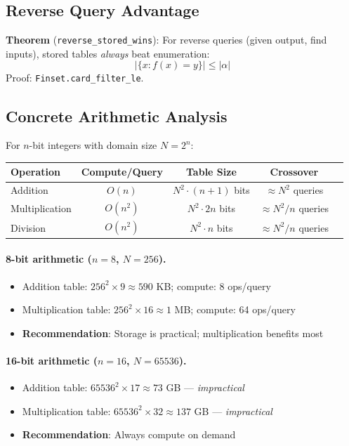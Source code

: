 \documentclass[11pt]{article}
\theoremstyle{definition}
\theoremstyle{remark}
\begin{document}
\subsection{Reverse Query Advantage}

\textbf{Theorem} (\texttt{reverse\_stored\_wins}):
For reverse queries (given output, find inputs), stored tables
\emph{always} beat enumeration:
\[
  |\{x : f(x) = y\}| \le |\alpha|
\]
\noindent
Proof: \texttt{Finset.card\_filter\_le}.

\subsection{Concrete Arithmetic Analysis}

For $n$-bit integers with domain size $N = 2^n$:

\begin{center}
\begin{tabular}{lcccc}
\toprule
\textbf{Operation} & \textbf{Compute/Query} & \textbf{Table Size} & \textbf{Crossover} \\
\midrule
Addition     & $O(n)$    & $N^2 \cdot (n+1)$ bits & $\approx N^2$ queries \\
Multiplication & $O(n^2)$ & $N^2 \cdot 2n$ bits & $\approx N^2 / n$ queries \\
Division     & $O(n^2)$  & $N^2 \cdot n$ bits  & $\approx N^2 / n$ queries \\
\bottomrule
\end{tabular}
\end{center}

\paragraph{8-bit arithmetic ($n = 8$, $N = 256$).}
\begin{itemize}
  \item Addition table: $256^2 \times 9 \approx 590$ KB; compute: 8 ops/query
  \item Multiplication table: $256^2 \times 16 \approx 1$ MB; compute: 64 ops/query
  \item \textbf{Recommendation}: Storage is practical; multiplication benefits most
\end{itemize}

\paragraph{16-bit arithmetic ($n = 16$, $N = 65536$).}
\begin{itemize}
  \item Addition table: $65536^2 \times 17 \approx 73$ GB --- \emph{impractical}
  \item Multiplication table: $65536^2 \times 32 \approx 137$ GB --- \emph{impractical}
  \item \textbf{Recommendation}: Always compute on demand
\end{itemize}
\end{document}
